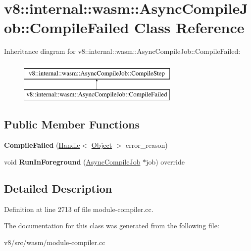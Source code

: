 \hypertarget{classv8_1_1internal_1_1wasm_1_1AsyncCompileJob_1_1CompileFailed}{}\section{v8\+:\+:internal\+:\+:wasm\+:\+:Async\+Compile\+Job\+:\+:Compile\+Failed Class Reference}
\label{classv8_1_1internal_1_1wasm_1_1AsyncCompileJob_1_1CompileFailed}
Inheritance diagram for v8\+:\+:internal\+:\+:wasm\+:\+:Async\+Compile\+Job\+:\+:Compile\+Failed\+:\begin{figure}[H]
\begin{center}
\leavevmode
\includegraphics[height=2.000000cm]{classv8_1_1internal_1_1wasm_1_1AsyncCompileJob_1_1CompileFailed}
\end{center}
\end{figure}
\subsection*{Public Member Functions}
\begin{DoxyCompactItemize}
\item 
\mbox{\label{classv8_1_1internal_1_1wasm_1_1AsyncCompileJob_1_1CompileFailed_a891db3d322d72d7f4071a1ac541d4d9f}} 
{\bfseries Compile\+Failed} (\mbox{\hyperlink{classv8_1_1internal_1_1Handle}{Handle}}$<$ \mbox{\hyperlink{classv8_1_1internal_1_1Object}{Object}} $>$ error\+\_\+reason)
\item 
\mbox{\label{classv8_1_1internal_1_1wasm_1_1AsyncCompileJob_1_1CompileFailed_a82be69556720a635da2a2d4b98c8b19b}} 
void {\bfseries Run\+In\+Foreground} (\mbox{\hyperlink{classv8_1_1internal_1_1wasm_1_1AsyncCompileJob}{Async\+Compile\+Job}} $\ast$job) override
\end{DoxyCompactItemize}


\subsection{Detailed Description}


Definition at line 2713 of file module-\/compiler.\+cc.



The documentation for this class was generated from the following file\+:\begin{DoxyCompactItemize}
\item 
v8/src/wasm/module-\/compiler.\+cc\end{DoxyCompactItemize}
